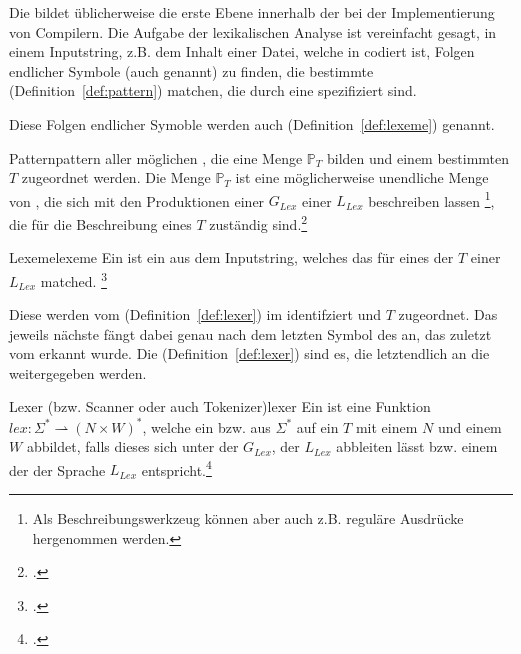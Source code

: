 Die  bildet üblicherweise die erste Ebene innerhalb der  bei der Implementierung von Compilern. Die Aufgabe der lexikalischen Analyse ist vereinfacht gesagt, in einem Inputstring, z.B. dem Inhalt einer Datei, welche in  codiert ist, Folgen endlicher Symbole (auch  genannt) zu finden, die bestimmte  (Definition~\ref{def:pattern}) matchen, die durch eine  spezifiziert sind.

Diese Folgen endlicher Symoble werden auch  (Definition~\ref{def:lexeme}) genannt.

\begin{Definition}{Pattern}{pattern}
   aller möglichen , die eine Menge $\mathbb{P}_{T}$ bilden und einem bestimmten  $T$ zugeordnet werden.
  Die Menge $\mathbb{P}_{T}$ ist eine möglicherweise unendliche Menge von , die sich mit den Produktionen einer  ${G}_{Lex}$ einer  ${L}_{Lex}$ beschreiben lassen \footnote{Als Beschreibungswerkzeug können aber auch z.B. reguläre Ausdrücke hergenommen werden.}, die für die Beschreibung eines  $T$ zuständig sind.\footcite{noauthor_what_nodate}
\end{Definition}

\begin{Definition}{Lexeme}{lexeme}
  Ein  ist ein  aus dem Inputstring, welches das  für eines der  $T$ einer  ${L}_{Lex}$ matched.
\footcite{noauthor_what_nodate}
\end{Definition}

Diese  werden vom  (Definition~\ref{def:lexer}) im  identifziert und  $T$ zugeordnet. Das jeweils nächste  fängt dabei genau nach dem letzten Symbol des  an, das zuletzt vom  erkannt wurde. Die  (Definition~\ref{def:lexer}) sind es, die letztendlich an die  weitergegeben werden.

\begin{Definition}{Lexer (bzw. Scanner oder auch Tokenizer)}{lexer}
  Ein  ist eine  Funktion \hspace{0.2cm}$lex: \Sigma^{*} \rightharpoonup (N \times W)^{*}$, welche ein  bzw.  aus $\Sigma^{*}$ auf ein  $T$ mit einem  $N$ und einem  $W$ abbildet, falls dieses  sich unter der  ${G}_{Lex}$, der  ${L_{Lex}}$ abbleiten lässt bzw. einem der  der Sprache $L_{Lex}$ entspricht.\footcite{noauthor_lecture-notes-2021_2022}
\end{Definition}

